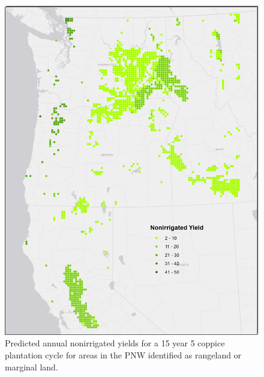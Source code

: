 \documentclass[preprint,12pt]{elsarticle}
\begin{document}
\begin{figure}[hp]
  \centering
  \includegraphics[width=1.0\linewidth]{nonirrigated_yield}
  \caption{Predicted annual nonirrigated yields for a 15 year 5 coppice plantation cycle for areas in the \ac{PNW} identified as rangeland or marginal land.}
  \label{fig:nonirrigated_yield}
\end{figure}



    
\end{document}
